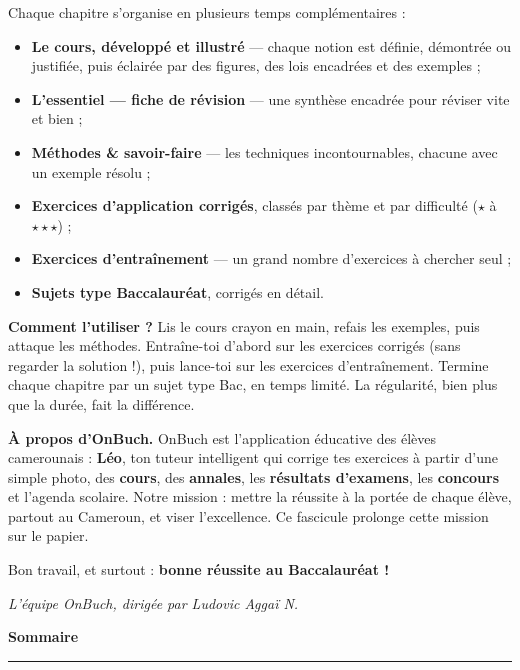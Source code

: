 \medskip
\noindent Chaque chapitre s'organise en plusieurs temps complémentaires :
\begin{itemize}
  \item \textbf{Le cours, développé et illustré} — chaque notion est définie, démontrée
        ou justifiée, puis éclairée par des figures, des lois encadrées et des exemples ;
  \item \textbf{L'essentiel — fiche de révision} — une synthèse encadrée pour réviser vite et bien ;
  \item \textbf{Méthodes \& savoir-faire} — les techniques incontournables, chacune avec un exemple résolu ;
  \item \textbf{Exercices d'application corrigés}, classés par thème et par difficulté ($\star$ à $\star\star\star$) ;
  \item \textbf{Exercices d'entraînement} — un grand nombre d'exercices à chercher seul ;
  \item \textbf{Sujets type Baccalauréat}, corrigés en détail.
\end{itemize}

\medskip
\noindent\textbf{Comment l'utiliser ?} Lis le cours crayon en main, refais les
exemples, puis attaque les méthodes. Entraîne-toi d'abord sur les exercices
corrigés (sans regarder la solution !), puis lance-toi sur les exercices
d'entraînement. Termine chaque chapitre par un sujet type Bac, en temps limité.
La régularité, bien plus que la durée, fait la différence.

\vspace{6pt}
\begin{aretenir}
\textbf{À propos d'OnBuch.} OnBuch est l'application éducative des élèves
camerounais : \textbf{Léo}, ton tuteur intelligent qui corrige tes exercices à
partir d'une simple photo, des \textbf{cours}, des \textbf{annales}, les
\textbf{résultats d'examens}, les \textbf{concours} et l'agenda scolaire. Notre
mission : mettre la réussite à la portée de chaque élève, partout au Cameroun, et
viser l'excellence. Ce fascicule prolonge cette mission sur le papier.
\end{aretenir}

\medskip
\noindent Bon travail, et surtout : \textbf{bonne réussite au Baccalauréat !}
\par\vspace{8pt}
\hfill{\sffamily\itshape\color{onbmuted} L'équipe OnBuch, dirigée par Ludovic Aggaï N.}
\clearpage

\thispagestyle{empty}
\vspace*{0.6cm}
{\sffamily\fontsize{30}{32}\selectfont\bfseries\color{onbink} Sommaire}\par\vspace{4pt}
{\color{onbo}\rule{5cm}{2.5pt}}\par\vspace{10pt}
{\hypersetup{linkcolor=onbink}\makeatletter{}\makeatother}

